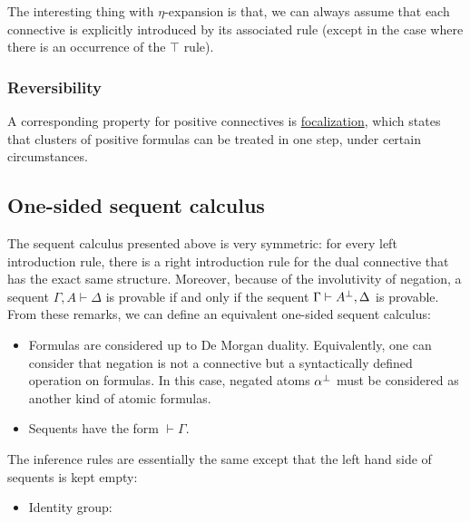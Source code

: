 The interesting thing with \(\eta\)-expansion is that, we can always
assume that each connective is explicitly introduced by its associated
rule (except in the case where there is an occurrence of the \(\top\)
rule).

\subsubsection{Reversibility}\label{reversibility-1}

A corresponding property for positive connectives is
\href{Reversibility_and_focalization}{focalization}, which states that
clusters of positive formulas can be treated in one step, under certain
circumstances.

\subsection{One-sided sequent
calculus}\label{one-sided-sequent-calculus}

The sequent calculus presented above is very symmetric: for every left
introduction rule, there is a right introduction rule for the dual
connective that has the exact same structure. Moreover, because of the
involutivity of negation, a sequent \(\Gamma,A\vdash\Delta\) is provable
if and only if the sequent \(\Gamma\vdash A^\bot,\Delta\) is provable.
From these remarks, we can define an equivalent one-sided sequent
calculus:

\begin{itemize}
\tightlist
\item
  Formulas are considered up to De Morgan duality. Equivalently, one can
  consider that negation is not a connective but a syntactically defined
  operation on formulas. In this case, negated atoms \(\alpha^\bot\)
  must be considered as another kind of atomic formulas.
\item
  Sequents have the form \(\vdash\Gamma\).
\end{itemize}

The inference rules are essentially the same except that the left hand
side of sequents is kept empty:

\begin{itemize}
\tightlist
\item
  Identity group:

  \begin{description}
  \tightlist
  \item[]
  \end{description}
\end{itemize}

